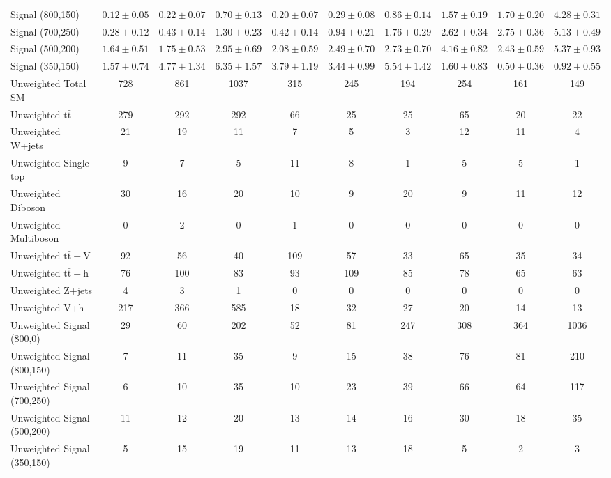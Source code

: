 \documentclass{standalone}
\begin{document}
\begin{tabular}{lccccccccc}
Signal (800,150) & $0.12 \pm 0.05$ & $0.22 \pm 0.07$ & $0.70 \pm 0.13$ & $0.20 \pm 0.07$ & $0.29 \pm 0.08$ & $0.86 \pm 0.14$ & $1.57 \pm 0.19$ & $1.70 \pm 0.20$ & $4.28 \pm 0.31$\\
Signal (700,250) & $0.28 \pm 0.12$ & $0.43 \pm 0.14$ & $1.30 \pm 0.23$ & $0.42 \pm 0.14$ & $0.94 \pm 0.21$ & $1.76 \pm 0.29$ & $2.62 \pm 0.34$ & $2.75 \pm 0.36$ & $5.13 \pm 0.49$\\
Signal (500,200) & $1.64 \pm 0.51$ & $1.75 \pm 0.53$ & $2.95 \pm 0.69$ & $2.08 \pm 0.59$ & $2.49 \pm 0.70$ & $2.73 \pm 0.70$ & $4.16 \pm 0.82$ & $2.43 \pm 0.59$ & $5.37 \pm 0.93$\\
Signal (350,150) & $1.57 \pm 0.74$ & $4.77 \pm 1.34$ & $6.35 \pm 1.57$ & $3.79 \pm 1.19$ & $3.44 \pm 0.99$ & $5.54 \pm 1.42$ & $1.60 \pm 0.83$ & $0.50 \pm 0.36$ & $0.92 \pm 0.55$\\
\midrule
Unweighted Total SM & 728 & 861 & 1037 & 315 & 245 & 194 & 254 & 161 & 149\\
Unweighted $\mathrm{t\bar{t}}$ & 279 & 292 & 292 & 66 & 25 & 25 & 65 & 20 & 22\\
Unweighted W+jets & 21 & 19 & 11 & 7 & 5 & 3 & 12 & 11 & 4\\
Unweighted Single top & 9 & 7 & 5 & 11 & 8 & 1 & 5 & 5 & 1\\
Unweighted Diboson & 30 & 16 & 20 & 10 & 9 & 20 & 9 & 11 & 12\\
Unweighted Multiboson & 0 & 2 & 0 & 1 & 0 & 0 & 0 & 0 & 0\\
Unweighted $\mathrm{t\bar{t}+V}$ & 92 & 56 & 40 & 109 & 57 & 33 & 65 & 35 & 34\\
Unweighted $\mathrm{t\bar{t}+h}$ & 76 & 100 & 83 & 93 & 109 & 85 & 78 & 65 & 63\\
Unweighted Z+jets & 4 & 3 & 1 & 0 & 0 & 0 & 0 & 0 & 0\\
Unweighted V+h & 217 & 366 & 585 & 18 & 32 & 27 & 20 & 14 & 13\\
Unweighted Signal (800,0) & 29 & 60 & 202 & 52 & 81 & 247 & 308 & 364 & 1036\\
Unweighted Signal (800,150) & 7 & 11 & 35 & 9 & 15 & 38 & 76 & 81 & 210\\
Unweighted Signal (700,250) & 6 & 10 & 35 & 10 & 23 & 39 & 66 & 64 & 117\\
Unweighted Signal (500,200) & 11 & 12 & 20 & 13 & 14 & 16 & 30 & 18 & 35\\
Unweighted Signal (350,150) & 5 & 15 & 19 & 11 & 13 & 18 & 5 & 2 & 3\\
\bottomrule
\end{tabular}
\end{document}

